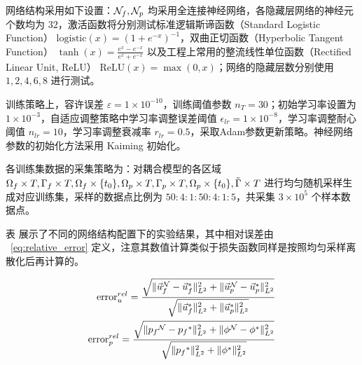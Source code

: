 \newcommand{\slf}{\mathrm{logistic}}
\newcommand{\htf}{\tanh}
\newcommand{\relu}{\mathrm{ReLU}}

网络结构采用如下设置：$\mathcal{N}_f, \mathcal{N}_p$ 均采用全连接神经网络，各隐藏层网络的神经元个数均为 $32$，激活函数将分别测试标准逻辑斯谛函数（Standard Logistic Function） $\slf (x) = (1 + e^{-x})^{-1}$，双曲正切函数（Hyperbolic Tangent Function） $\htf (x) = \frac{e^x - e^{-x}}{e^x + e^{-x}}$ 以及工程上常用的整流线性单位函数（Rectified Linear Unit, ReLU） $\relu (x)= \max(0,x)$；网络的隐藏层数分别使用 $1,2,4,6,8$ 进行测试。

\newcommand{\num}[2]{{#1} \times 10^{#2}}
训练策略上，容许误差 $\varepsilon = \num{1}{-10}$，训练阈值参数 $n_T = 30$；初始学习率设置为 $\num{1}{-3}$，自适应调整策略中学习率调整误差阈值 $\epsilon_{lr} = \num{1}{-8}$，学习率调整耐心阈值 $n_{lr} = 10$，学习率调整衰减率 $r_{lr} = 0.5$，采取Adam参数更新策略。神经网络参数的初始化方法采用 Kaiming 初始化。

各训练集数据的采集策略为：对耦合模型的各区域 ${\Omega_f} \times T,{\Gamma_f} \times T,{\Omega_f} \times \{t_0\},{\Omega_p} \times T,{\Gamma_p} \times T,{\Omega_p} \times \{t_0\},{\tilde{\Gamma}} \times T$ 进行均匀随机采样生成对应训练集，采样的数据点比例为 $50:4:1:50:4:1:5$，共采集 $3 \times {10}^{5}$ 个样本数据点。

表 展示了不同的网络结构配置下的实验结果，其中相对误差由 ~\eqref{eq:relative_error} 定义，注意其数值计算类似于损失函数同样是按照均匀采样离散化后再计算的。

\newcommand{\relaErr}{\mathrm{error}^{rel}}
\newcommand{\toRelaErr}[2]{
    \frac{\sqrt{\|{#1}^{\NN} - {#1}^* \|_{\Lp[2]}^2 + \|{#2}^{\NN} - {#2}^* \|_{\Lp[2]}^2}}{\sqrt{\|{#1}^* \|_{\Lp[2]}^2 + \|{#2}^* \|_{\Lp[2]}^2}}
}
\begin{equation}\label{eq:relative_error}
    \begin{aligned}
        \relaErr_{u} = \toRelaErr{\Uf}{\Up} \\
        \relaErr_{p} = \toRelaErr{\pf}{\pp}
    \end{aligned}
\end{equation}


